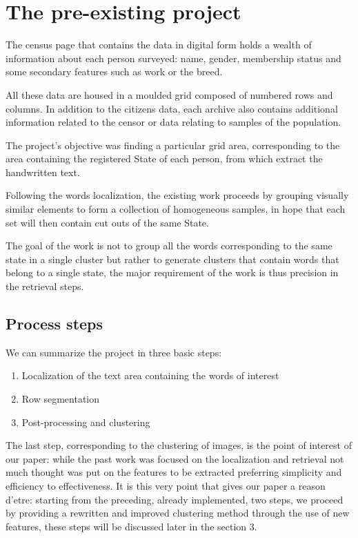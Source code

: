 \section{The pre-existing project}

The census page that contains the data in digital form holds a wealth of information about each person surveyed: name, gender, membership status and some secondary features such as work or the breed. 

All these data are housed in a moulded grid composed of numbered rows and columns. In addition to the citizens data, each archive also contains additional information related to the censor or data relating to samples of the population.

The project's objective was finding a particular grid area, corresponding to the area containing the registered State of each person, from which extract the handwritten text.

Following the words localization, the existing work proceeds by grouping visually similar elements to form a collection of homogeneous samples, in hope that each set will then contain cut outs of the same State.

The goal of the work is not to group all the words corresponding to the same state in a single cluster but rather to generate clusters that contain words that belong to a single state, the major requirement of the work is thus precision in the retrieval steps.

\subsection{Process steps}

We can summarize the project in three basic steps:
\begin{enumerate}
\item Localization of the text area containing the words of interest
\item Row segmentation
\item Post-processing and clustering
\end{enumerate}

The last step, corresponding to the clustering of images, is the point of interest of our paper: while the past work was focused on the localization and retrieval not much thought was put on the features to be extracted preferring simplicity and efficiency to effectiveness.
It is this very point that gives our paper a reason d'etre: starting from the preceding, already implemented, two steps, we proceed by providing a rewritten and improved clustering method through the use of new features, these steps will be discussed later in the section 3.

